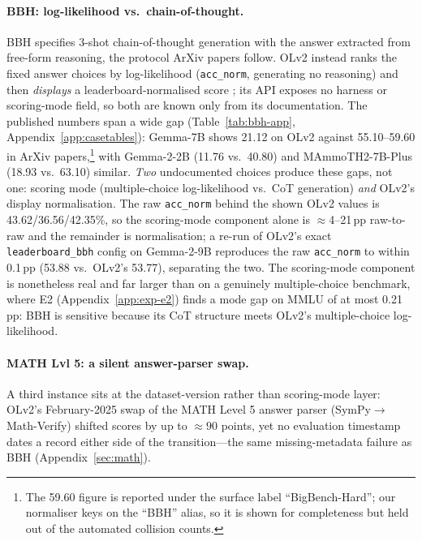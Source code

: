 \documentclass[11pt]{article}
\begin{document}
\paragraph{BBH: log-likelihood vs.\ chain-of-thought.}\label{sec:bbh}
BBH \citep{suzgun2023} specifies 3-shot chain-of-thought generation with the
answer extracted from free-form reasoning, the protocol ArXiv papers follow.
OLv2 instead ranks the fixed answer choices by log-likelihood
(\texttt{acc\_norm}, generating no reasoning) and then \emph{displays} a
leaderboard-normalised score \citep{openllmv2about}; its API exposes no harness or
scoring-mode field, so both are known only from its documentation. The published
numbers span a wide gap (Table~\ref{tab:bbh-app}, Appendix~\ref{app:casetables}):
Gemma-7B shows 21.12 on OLv2 against 55.10--59.60 in ArXiv papers,\footnote{The
59.60 figure is reported under the surface label ``BigBench-Hard''; our normaliser
keys on the ``BBH'' alias, so it is shown for completeness but held out of the
automated collision counts.} with Gemma-2-2B (11.76 vs.\ 40.80) and
MAmmoTH2-7B-Plus (18.93 vs.\ 63.10) similar. \emph{Two} undocumented choices
produce these gaps, not one: scoring mode (multiple-choice log-likelihood vs.\ CoT
generation) \emph{and} OLv2's display normalisation. The raw \texttt{acc\_norm}
behind the shown OLv2 values is 43.62/36.56/42.35\%, so the scoring-mode component
alone is $\approx$4--21\,pp raw-to-raw and the remainder is normalisation; a re-run
of OLv2's exact \texttt{leaderboard\_bbh} config on Gemma-2-9B reproduces the raw
\texttt{acc\_norm} to within 0.1\,pp (53.88 vs.\ OLv2's 53.77), separating the two.
The scoring-mode component is nonetheless real and far larger than on a genuinely
multiple-choice benchmark, where E2 (Appendix~\ref{app:exp-e2}) finds a mode gap on
MMLU of at most 0.21\,pp: BBH is sensitive because its CoT structure meets OLv2's
multiple-choice log-likelihood.

\paragraph{MATH Lvl 5: a silent answer-parser swap.} A third instance sits at the
dataset-version rather than scoring-mode layer: OLv2's February-2025 swap of the
MATH Level 5 answer parser (SymPy${\to}$Math-Verify) shifted scores by up to
${\approx}90$ points, yet no evaluation timestamp dates a record either side of
the transition---the same missing-metadata failure as BBH
(Appendix~\ref{sec:math}).
\end{document}
